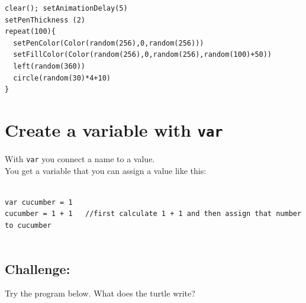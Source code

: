   

\begin{lstlisting}[basicstyle={\ttfamily\fontsize{16}{19}\selectfont},numbers=none]
clear(); setAnimationDelay(5)
setPenThickness (2)
repeat(100){
  setPenColor(Color(random(256),0,random(256)))
  setFillColor(Color(random(256),0,random(256),random(100)+50))
  left(random(360))
  circle(random(30)*4+10)
}
\end{lstlisting}
        
\chapter{Create a variable with \lstinline{var}}With \lstinline{var} you connect a name to a value.\\
You get a variable that you can assign a value like this:

\begin{lstlisting}[numbers=none]

var cucumber = 1
cucumber = 1 + 1   //first calculate 1 + 1 and then assign that number to cucumber     
        
\end{lstlisting}
        
\section*{\color{BrickRed}Challenge:}
Try the program below. What does the turtle write?

